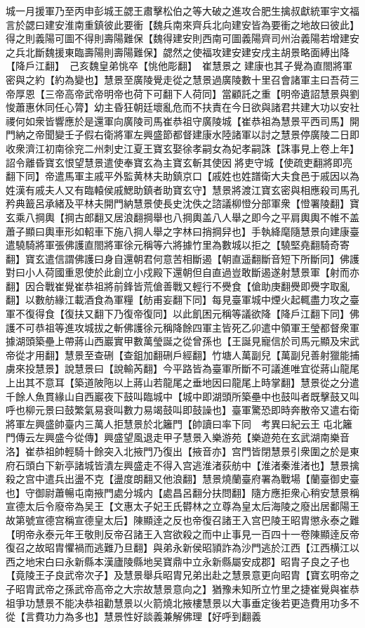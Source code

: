 城一月援軍乃至丙申彭城王勰王肅擊松伯之等大破之進攻合肥生擒叔獻統軍宇文福言於勰曰建安淮南重鎮彼此要衝【魏兵南來齊兵北向建安皆為要衝之地故曰彼此】得之則義陽可圖不得則壽陽難保【魏得建安則西南可圖義陽齊司州治義陽若增建安之兵北斷魏援東臨壽陽則壽陽難保】勰然之使福攻建安建安戌主胡景略面縛出降【降戶江翻】　己亥魏皇弟恌卒【恌他彫翻】　崔慧景之建康也其子覺為直閤將軍密與之約【約為變也】慧景至廣陵覺走從之慧景過廣陵數十里召會諸軍主曰吾荷三帝厚恩【三帝高帝武帝明帝也荷下可翻下人荷同】當顧託之重【明帝遺詔慧景與劉悛蕭惠休同任心膂】幼主昏狂朝廷壞亂危而不扶責在今日欲與諸君共建大功以安社禝何如衆皆響應於是還軍向廣陵司馬崔恭祖守廣陵城【崔恭祖為慧景平西司馬】開門納之帝聞變壬子假右衛將軍左興盛節都督建康水陸諸軍以討之慧景停廣陵二日即收衆濟江初南徐兖二州刺史江夏王寶玄娶徐孝嗣女為妃孝嗣誅【誅事見上卷上年】詔令離昏寶玄恨望慧景遣使奉寶玄為主寶玄斬其使因將吏守城【使疏吏翻將即亮翻下同】帝遣馬軍主戚平外監黄林夫助鎮京口【戚姓也姓譜衛大夫食邑于戚因以為姓漢有戚夫人又有臨轅侯戚鰓助鎮者助寶玄守】慧景將渡江寶玄密與相應殺司馬孔矜典籖呂承緒及平林夫開門納慧景使長史沈佚之諮議柳憕分部軍衆【憕署陵翻】寶玄乘八掆輿【掆古郎翻又居浪翻掆舉也八掆輿盖八人舉之即今之平肩輿輿不帷不盖蕭子顯曰輿車形如軺車下施八掆人舉之字林曰捎掆舁也】手執絳麾隨慧景向建康臺遣驍騎將軍張佛護直閤將軍徐元稱等六將據竹里為數城以拒之【驍堅堯翻騎奇寄翻】寶玄遣信謂佛護曰身自還朝君何意苦相斷遏【朝直遥翻斷音短下所斷同】佛護對曰小人荷國重恩使於此創立小戍殿下還朝但自直過豈敢斷遏遂射慧景軍【射而亦翻】因合戰崔覺崔恭祖將前鋒皆荒傖善戰又輕行不㸑食【傖助庚翻㸑即㸑字取亂翻】以數舫緣江載酒食為軍糧【舫甫妄翻下同】每見臺軍城中煙火起輒盡力攻之臺軍不復得食【復扶又翻下乃復帝復同】以此飢困元稱等議欲降【降戶江翻下同】佛護不可恭祖等進攻城拔之斬佛護徐元稱降餘四軍主皆死乙卯遣中領軍王瑩都督衆軍據湖頭築壘上帶蔣山西巖實甲數萬瑩誕之從曾孫也【王誕見寵信於司馬元顯及宋武帝從才用翻】慧景至查硎【查鉏加翻硎戶經翻】竹塘人萬副兒【萬副兒善射獵能捕虜來投慧景】說慧景曰【說輸芮翻】今平路皆為臺軍所斷不可議進唯宜從蔣山龍尾上出其不意耳【築道陂陁以上蔣山若龍尾之垂地因曰龍尾上時掌翻】慧景從之分遣千餘人魚貫緣山自西巖夜下鼓叫臨城中【城中即湖頭所築壘中也鼓叫者既擊鼓又叫呼也柳元景曰鼓繁氣易衰叫數力易竭鼓叫即鼓譟也】臺軍驚恐即時奔散帝又遣右衛將軍左興盛帥臺内三萬人拒慧景於北籬門【帥讀曰率下同　考異曰紀云王屯北籬門傳云左興盛今從傳】興盛望風退走甲子慧景入樂游苑【樂遊苑在玄武湖南樂音洛】崔恭祖帥輕騎十餘突入北掖門乃復出【掖音亦】宫門皆閉慧景引衆圍之於是東府石頭白下新亭諸城皆潰左興盛走不得入宫逃淮渚荻舫中【淮渚秦淮渚也】慧景擒殺之宫中遣兵出盪不克【盪度朗翻又他浪翻】慧景燒蘭臺府署為戰場【蘭臺御史臺也】守御尉蕭暢屯南掖門處分城内【處昌呂翻分扶問翻】隨方應拒衆心稍安慧景稱宣德太后令廢帝為吴王【文惠太子妃王氏欎林之立尊為皇太后海陵之廢出居鄱陽王故第號宣德宫稱宣德皇太后】陳顯逹之反也帝復召諸王入宫巴陵王昭胄懲永泰之難【明帝永泰元年王敬則反帝召諸王入宫欲殺之而中止事見一百四十一卷陳顯逹反帝復召之故昭胄懼禍而逃難乃旦翻】與弟永新侯昭頴詐為沙門逃於江西【江西横江以西之地宋白曰永新縣本漢廬陵縣地吴寶鼎中立永新縣屬安成郡】昭胄子良之子也【竟陵王子良武帝次子】及慧景舉兵昭胄兄弟出赴之慧景意更向昭胄【寶玄明帝之子昭胄武帝之孫武帝高帝之大宗故慧景意向之】猶豫未知所立竹里之捷崔覺與崔恭祖爭功慧景不能决恭祖勸慧景以火箭燒北掖樓慧景以大事垂定後若更造費用功多不從【言費功力為多也】慧景性好談義兼解佛理【好呼到翻義